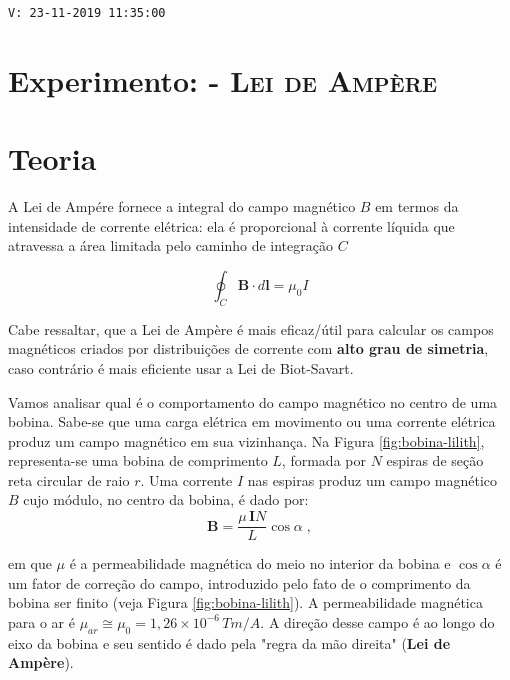 \noindent \texttt{V: 23-11-2019 11:35:00}

\section*{Experimento: - \textsc{Lei de Ampère}}
\section*{Teoria}
A Lei de Ampére fornece a integral do campo magnético $B$ em termos da intensidade de corrente elétrica: ela é proporcional à corrente líquida que atravessa a área limitada pelo caminho de integração $C$

\begin{equation}
    \oint _{C}{\mathbf  {B}}\cdot d{\mathbf  {l}}=\mu _{0}I
    \label{eq:eq-ampere-integral}
\end{equation}

\noindent 
Cabe ressaltar, que a Lei de Ampère é mais eficaz/útil para calcular os campos magnéticos criados por distribuições de corrente com \textbf{alto grau de simetria}, caso contrário é mais eficiente usar a Lei de Biot-Savart.

\noindent
Vamos analisar qual é o comportamento do campo magnético no centro de uma bobina. Sabe-se que uma carga elétrica em movimento ou uma corrente elétrica produz um campo magnético em sua vizinhança. Na Figura \ref{fig:bobina-lilith}, representa-se uma bobina de comprimento $L$, formada por $N$ espiras de seção reta circular de raio $r$. Uma corrente $I$ nas espiras produz um campo magnético $B$ cujo módulo, no centro da bobina, é dado por:
\begin{equation}
    \mathbf{B}=\frac{\mu\,\mathbf{I}N}{L}\cos \alpha\;,
\end{equation}

\noindent
em que $\mu$ é a permeabilidade magnética do meio no interior da bobina e $\cos \alpha$ é um fator de
correção do campo, introduzido pelo fato de o comprimento da bobina ser finito (veja Figura \ref{fig:bobina-lilith}). A
permeabilidade magnética para o ar é $\mu_{ar} \cong \mu_{0} = 1,26 \times 10^{-6}\,Tm/A$. 
A direção desse campo é ao longo do eixo da bobina e seu sentido é dado pela "regra da mão direita" (\textbf{Lei de Ampère}).

